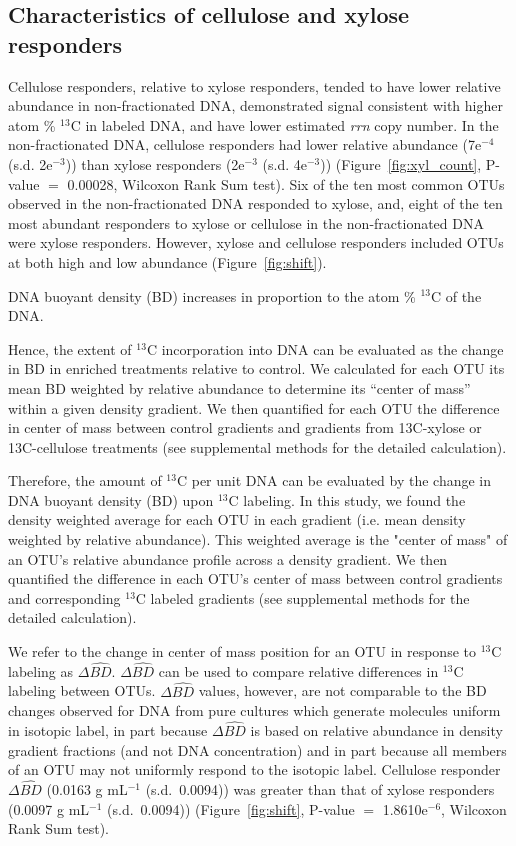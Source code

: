 \subsection{Characteristics of cellulose and xylose responders}
Cellulose responders, relative to xylose responders, tended to have lower
relative abundance in non-fractionated DNA, demonstrated signal consistent with
higher atom \% $^{13}$C in labeled DNA, and have lower estimated \textit{rrn} copy number. In the
non-fractionated DNA, cellulose responders had lower relative abundance
(7e$^{-4}$ (s.d. 2e$^{-3}$)) than xylose responders (2e$^{-3}$ (s.d.
4e$^{-3}$)) (Figure~\ref{fig:xyl_count}, P-value $=$ 0.00028, Wilcoxon Rank Sum
test). Six of the ten most common OTUs observed in the non-fractionated DNA
responded to xylose, and, eight of the ten most abundant responders to xylose
or cellulose in the non-fractionated DNA were xylose responders. However,
xylose and cellulose responders included OTUs at both high and low abundance
(Figure~\ref{fig:shift}).

DNA buoyant density (BD) increases in proportion to the atom \% $^{13}$C of the
DNA.

Hence, the extent of $^{13}$C incorporation into DNA can be evaluated as the
change in BD in enriched treatments relative to control. We calculated for each
OTU its mean BD weighted by relative abundance to determine its “center of
mass” within a given density gradient. We then quantified for each OTU the
difference in center of mass between control gradients and gradients from
13C-xylose or 13C-cellulose treatments (see supplemental methods for the
detailed calculation). 

Therefore, the amount of $^{13}$C per unit DNA can be evaluated by the change
in DNA buoyant density (BD) upon $^{13}$C labeling. In this study, we found the
density weighted average for each OTU in each gradient (i.e. mean density
weighted by relative abundance). This weighted average is the "center of mass"
of an OTU's relative abundance profile across a density gradient. We then
quantified the difference in each OTU's center of mass between control
gradients and corresponding $^{13}$C labeled gradients (see supplemental
methods for the detailed calculation). 

We refer to the change in center of mass position for an OTU in response to
$^{13}$C labeling as $\Delta\hat{BD}$. $\Delta\hat{BD}$ can be used to compare
relative differences in $^{13}$C labeling between OTUs. $\Delta\hat{BD}$
values, however, are not comparable to the BD changes observed for DNA from
pure cultures which generate molecules uniform in isotopic label, in part
because $\Delta\hat{BD}$ is based on relative abundance in density gradient
fractions (and not DNA concentration) and in part because all members of an OTU
may not uniformly respond to the isotopic label. Cellulose responder
$\Delta\hat{BD}$ (0.0163 g mL$^{-1}$ (s.d.~0.0094)) was greater than that of
xylose responders (0.0097 g mL$^{-1}$ (s.d.~0.0094)) (Figure~\ref{fig:shift},
P-value $=$
1.8610e$^{-6}$, Wilcoxon Rank Sum test). 

